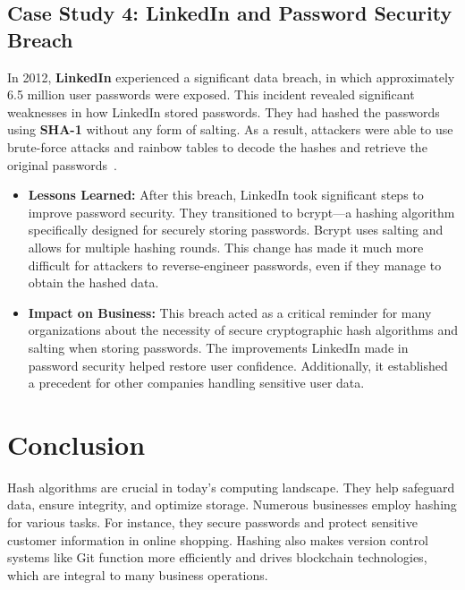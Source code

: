 \documentclass[11pt,a4paper]{article}
\begin{document}
    \subsection*{Case Study 4: LinkedIn and Password Security Breach}
    In 2012, \textbf{LinkedIn} experienced a significant data breach, in which approximately 6.5 million user passwords were exposed. This incident revealed significant weaknesses in how LinkedIn stored passwords. They had hashed the passwords using \textbf{SHA-1} without any form of salting. As a result, attackers were able to use brute-force attacks and rainbow tables to decode the hashes and retrieve the original passwords~\cite{linkedin}\cite{linkedin-2}.
        \begin{itemize}
            \item \textbf{Lessons Learned:}
            \newline
            After this breach, LinkedIn took significant steps to improve password security. They transitioned to bcrypt—a hashing algorithm specifically designed for securely storing passwords. Bcrypt uses salting and allows for multiple hashing rounds. This change has made it much more difficult for attackers to reverse-engineer passwords, even if they manage to obtain the hashed data.

            \item \textbf{Impact on Business:}
            \newline
            This breach acted as a critical reminder for many organizations about the necessity of secure cryptographic hash algorithms and salting when storing passwords. The improvements LinkedIn made in password security helped restore user confidence. Additionally, it established a precedent for other companies handling sensitive user data.

        \end{itemize}

\newpage

\section*{Conclusion}

Hash algorithms are crucial in today's computing landscape. They help safeguard data, ensure integrity, and optimize storage. Numerous businesses employ hashing for various tasks. For instance, they secure passwords and protect sensitive customer information in online shopping. Hashing also makes version control systems like Git function more efficiently and drives blockchain technologies, which are integral to many business operations.
\end{document}
